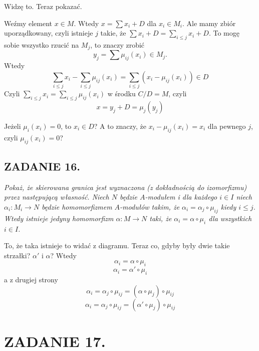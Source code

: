 \documentclass{article}
\begin{document}
Widzę to. Teraz pokazać.

Weźmy element $x\in M$. Wtedy $x=\sum x_i+D$ dla $x_i\in M_i$. Ale mamy zbiór uporządkowany, czyli istnieje $j$ takie, że $\sum x_i+D=\sum\limits_{i\leq j}x_i+D$. To mogę sobie wszystko rzucić na $M_j$, to znaczy zrobić
$$y_j=\sum\mu_{ij}(x_i)\in M_j.$$
 Wtedy
 $$\sum\limits_{i\leq j}x_i-\sum\limits_{i\leq j}\mu_{ij}(x_i)=\sum\limits_{i\leq j}(x_i-\mu_{ij}(x_i))\in D$$
Czyli $\sum\limits_{i\leq j}x_i=\sum\limits_{i\leq j}\mu_{ij}(x_i)$ w środku $C/D=M$, czyli
$$x=y_j+D=\mu_j(y_j)$$
\medskip

Jeżeli $\mu_i(x_i)=0$, to $x_i\in D$? A to znaczy, że $x_i-\mu_{ij}(x_i)=x_i$ dla pewnego $j$, czyli $\mu_{ij}(x_i)=0$? 

\subsection*{ZADANIE 16.}
{\slshape\color{yellow}
Pokaż, że skierowana granica jest wyznaczona (z dokładnością do izomorfizmu) przez następującą własność. Niech $N$ będzie $A$-modułem i dla każdego $i\in I$ niech $\alpha_i:M_i\to N$ będzie homomorfizmem  $A$-modułów takim, że $\alpha_i=\alpha_j\circ\mu_{ij}$ kiedy $i\leq j$. Wtedy istnieje jedyny homomorfizm $\alpha:M\to N$ taki, że $\alpha_i=\alpha\circ\mu_i$ dla wszystkich $i\in I$.
}

\begin{center}
\end{center}

To, że taka istnieje to widać z diagramu. Teraz co, gdyby były dwie takie strzałki? $\alpha'$ i $\alpha$? Wtedy
$$\alpha_i=\alpha\circ\mu_i$$
$$\alpha_i=\alpha'\circ\mu_i$$
a z drugiej strony
$$\alpha_i=\alpha_j\circ\mu_{ij}=(\alpha\circ\mu_j)\circ\mu_{ij}$$
$$\alpha_i=\alpha_j\circ\mu_{ij}=(\alpha'\circ\mu_j)\circ\mu_{ij}$$

\section*{ZADANIE 17.}
\end{document}
